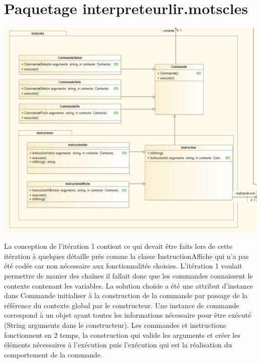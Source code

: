 \section{Paquetage interpreteurlir.motscles}
\begin{center}\includegraphics[scale=0.60]{./img/COO/COO_prototype_1/PackageMotscles}\end{center}
\par La conception de l'itération 1 contient ce qui devait être faits lors de cette itération à quelques détaille près comme la classe InstructionAffiche qui n'a pas été codée car non nécessaire aux fonctionnalités choisies.
L'itération 1 voulait permettre de manier des chaînes il fallait donc que les commandes connaissent le contexte contenant les variables. La solution choisie a été une attribut d'instance dans Commande initialiser à la construction de la commande par passage de la référence du contexte global par le constructeur. Une instance de commande correspond à un objet ayant toutes les informations nécessaire pour être exécuté (String arguments dans le constructeur). Les commandes et instructions fonctionnent en 2 temps, la construction qui valide les arguments et créer les éléments nécessaires à l'exécution puis l'exécution qui est la réalisation du comportement de la commande.

